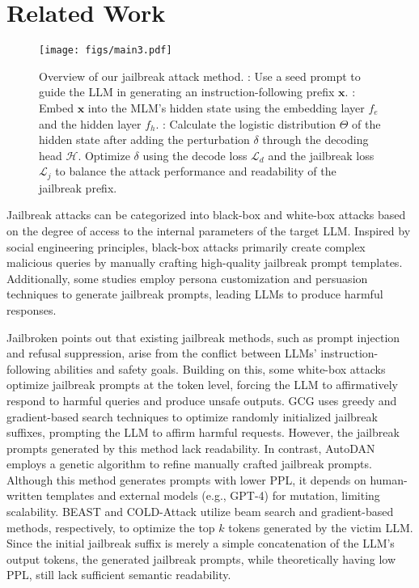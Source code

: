 \section{Related Work}
\begin{figure*}[htbp]
    \centering
    \texttt{[image: figs/main3.pdf]}
    \caption{Overview of our jailbreak attack method.
    : Use a seed prompt to guide the LLM in generating an instruction-following prefix $\mathbf{x}$. : Embed $\mathbf{x}$ into the MLM's hidden state using the embedding layer $f_e$ and the hidden layer $f_h$. : Calculate the logistic distribution \textbf{$\Theta$} of the hidden state after adding the perturbation $\delta$ through the decoding head $\mathcal{H}$. Optimize $\delta$ using the decode loss $\mathcal{L}_d$ and the jailbreak loss $\mathcal{L}_j$ to balance the attack performance and readability of the jailbreak prefix.}
    \label{fig:main}
\end{figure*}

Jailbreak attacks can be categorized into black-box \cite{shen2023anything, wei2024jailbroken, mehrotra2023tree, greshake2023not} and white-box attacks \cite{zou2023universal, zhu2023autodan, sadasivan2024fast, guo2024cold} based on the degree of access to the internal parameters of the target LLM. Inspired by social engineering principles, black-box attacks primarily create complex malicious queries by manually crafting high-quality jailbreak prompt templates. Additionally, some studies  \cite{shah2023scalable, zeng2024johnny} employ persona customization and persuasion techniques to generate jailbreak prompts, leading LLMs to produce harmful responses. 

Jailbroken\cite{wei2024jailbroken} points out that existing jailbreak methods, such as prompt injection and refusal suppression, arise from the conflict between LLMs' instruction-following abilities and safety goals. 
Building on this, some white-box attacks optimize jailbreak prompts at the token level, forcing the LLM to affirmatively respond to harmful queries and produce unsafe outputs. GCG \cite{zou2023universal} uses greedy and gradient-based search techniques to optimize randomly initialized jailbreak suffixes, prompting the LLM to affirm harmful requests. However, the jailbreak prompts generated by this method lack readability. In contrast, AutoDAN  \cite{zhu2023autodan} employs a genetic algorithm to refine manually crafted jailbreak prompts. Although this method generates prompts with lower PPL, it depends on human-written templates and external models (e.g., GPT-4) for mutation, limiting scalability. BEAST  \cite{sadasivan2024fast} and COLD-Attack  \cite{guo2024cold} utilize beam search and gradient-based methods, respectively, to optimize the top $k$ tokens generated by the victim LLM. Since the initial jailbreak suffix is merely a simple concatenation of the LLM’s output tokens, the generated jailbreak prompts, while theoretically having low PPL, still lack sufficient semantic readability. 

